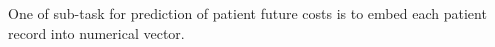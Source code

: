 
One of sub-task for prediction of patient future costs is to embed each patient record into numerical vector. 